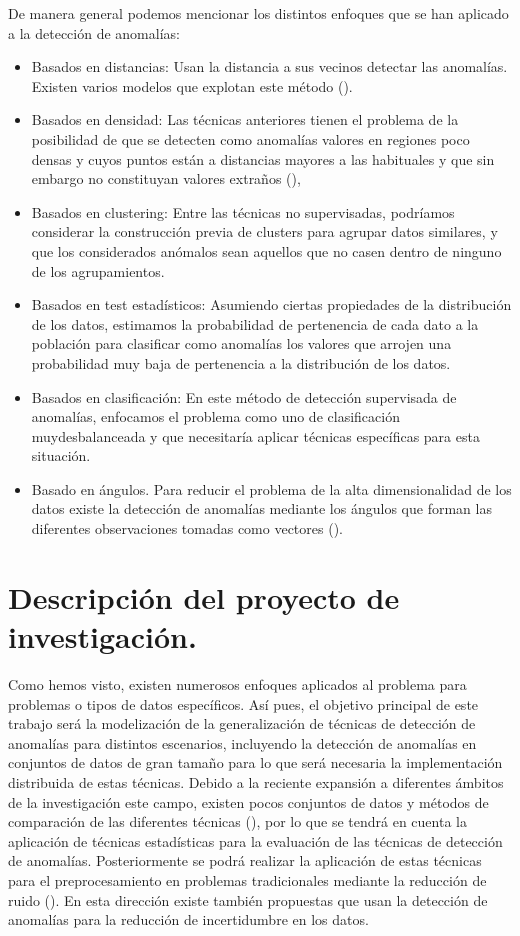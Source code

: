 \documentclass[11pt]{article}
\begin{document}
De manera general podemos mencionar los distintos enfoques que se han
aplicado a la detección de anomalías: 
\begin{itemize}
\item Basados en distancias: Usan la distancia a sus vecinos detectar las
anomalías. Existen varios modelos que explotan este método
(\cite{angiulli05outlier}).
\item Basados en densidad: Las técnicas anteriores tienen el problema de
la posibilidad de que se detecten como anomalías valores en regiones
poco densas y cuyos puntos están a distancias mayores a las
habituales y que sin embargo no constituyan valores extraños
(\cite{Breunig00lof}),
\item Basados en clustering: Entre las técnicas no supervisadas,
podríamos considerar la construcción previa de clusters para agrupar
datos similares, y que los considerados anómalos sean aquellos que
no casen dentro de ninguno de los agrupamientos.
\item Basados en test estadísticos: Asumiendo ciertas propiedades de la
distribución de los datos, estimamos la probabilidad de
pertenencia de cada dato a la población para clasificar como
anomalías los valores que arrojen una probabilidad muy baja de
pertenencia a la distribución de los datos.
\item Basados en clasificación: En este método de detección supervisada de
anomalías, enfocamos el problema como uno de clasificación
muydesbalanceada y que necesitaría aplicar técnicas específicas para
esta situación.
\item Basado en ángulos. Para reducir el problema de la alta
dimensionalidad de los datos existe la detección de anomalías
mediante los ángulos que forman las diferentes observaciones tomadas
como vectores (\cite{Kriegel08angle}).
\end{itemize}

\section{Descripción del proyecto de investigación.}
\label{sec:orgca0f203}

Como hemos visto, existen numerosos enfoques aplicados al problema
  para problemas o tipos de datos específicos. Así pues, el objetivo
  principal de este trabajo será la modelización de la generalización
  de técnicas de detección de anomalías para distintos escenarios,
  incluyendo la detección de anomalías en conjuntos de datos de gran
  tamaño para lo que será necesaria la implementación distribuida de
  estas técnicas. Debido a la reciente expansión a diferentes ámbitos de la
  investigación este campo, existen pocos conjuntos de datos y métodos
  de comparación de las diferentes técnicas (\cite{Campos16evaluation}),
  por lo que se tendrá en cuenta la aplicación de técnicas
  estadísticas para la evaluación de las técnicas de detección de
  anomalías. Posteriormente se podrá realizar la aplicación de estas
  técnicas para el preprocesamiento en problemas tradicionales
  mediante la reducción de ruido (\cite{Liu04line}). En esta dirección
  existe también propuestas que usan la detección de anomalías para la
  reducción de incertidumbre en los datos.  
\end{document}
